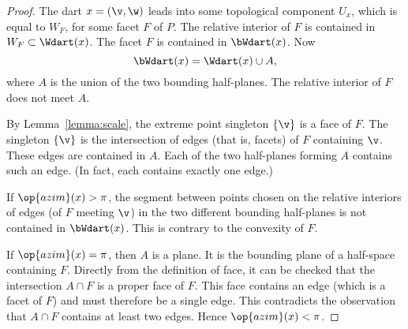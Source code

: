 \begin{proof} The dart $x=(\v,\w)$ leads into some topological
component $U_x$, which is equal to $W_F$, for some facet $F$ of $P$.
The relative interior of $F$ is contained in $W_F\subset \Wdart(x)$.
The facet $F$ is contained in $\bWdart(x)$. Now
\begin{displaymath}
\bWdart(x) = \Wdart(x)\cup A,
\end{displaymath}
where $A$ is the union of the two bounding half-planes.  The relative
interior of $F$ does not meet $A$.

By Lemma~\ref{lemma:scale}, the extreme point singleton $\{\v\}$ is a face of $F$.  The
singleton $\{\v\}$ is the intersection of edges (that is, facets) of $F$
containing $\v$.  These edges are contained in $A$.  Each of the two
half-planes forming $A$ contains such an edge. (In fact, each contains
exactly one edge.)  %
%
%
%

If $\op{azim}(x)>\pi$, the segment between points chosen on the
relative interiors of edges (of $F$ meeting $\v$) in the two different
bounding half-planes is not contained in $\bWdart(x)$.  This is
contrary to the convexity of $F$.  %
%

If $\op{azim}(x)=\pi$, then $A$ is a plane.  It is the bounding plane
of a half-space containing $F$.  Directly from the definition of face,
it can be checked that the intersection $A\cap F$ is a proper face of
$F$.  This face contains an edge (which is a facet of $F$) and must
therefore be a single edge.  This contradicts the observation that
$A\cap F$ contains at least two edges.  Hence $\op{azim}(x)<\pi$.
\end{proof}


